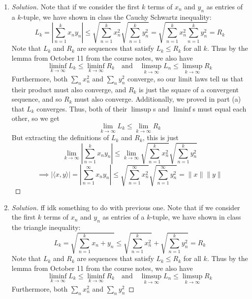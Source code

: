 \documentclass{article}
\begin{document}
\begin{enumerate}
\begin{proof}[Solution]
		Finally, by the comparison test, since $\sum_n (x_n^2 + b_n^2)$,
		we have that $\sum_n (x_ny_n)$ converges as well.
	\end{proof}
	\item \begin{proof}[Solution]\let\qed\relax
		Note that if we consider the first $k$ terms of $x_n$ and $y_n$
		as entries of a $k$-tuple,
		we have shown in class the Cauchy Schwartz inequality:
		\[
			L_k = \left\lvert\sum_{n=1}^k x_ny_n\right\rvert \leq
			\sqrt{\sum_{n=1}^k x^2_n}\sqrt{\sum_{n=1}^k y^2_n}
			= \sqrt{\sum_{n=1}^k x^2_n\sum_{n=1}^k y^2_n} = R_k
		\]
		Note that $L_k$ and $R_k$ are sequences that satisfy $L_k \leq R_k$
		for all $k$.
		Thus by the lemma from October 11 from the course notes,
		we also have
		\[
			\liminf_{k\to\infty} L_k \leq \liminf_{k\to\infty} R_k
			\quad \text{and} \quad
			\limsup_{k\to\infty}L_n \leq \limsup_{k\to\infty}R_k
		\]
		Furthermore, both $\sum_n x_n^2$ and $\sum_n y_n^2$
		converge,
		so our limit laws tell us that their product must also converge,
		and $R_k$ is just the square of a convergent sequence,
		and so $R_k$ must also converge.
		Additionally, we proved in part (a) that $L_k$ converges.
		Thus, both of their $\limsup$s and $\liminf$s
		must equal each other, so we get
		\[
			\lim_{k\to\infty} L_k \leq \lim_{k\to\infty} R_k
		\]
		But extracting the definitions of $L_k$ and $R_k$,
		this is just
		\[
			\lim_{k\to\infty} \left\lvert\sum_{n=1}^k x_ny_n\right\rvert \leq
			\lim_{k\to\infty} \sqrt{\sum_{n=1}^k x^2_n}\sqrt{\sum_{n=1}^k y^2_n}
		\]
		\[
			\implies |\langle x,y \rangle| =
			\left\lvert\sum_{n=1}^\infty x_ny_n\right\rvert \leq
			\sqrt{\sum_{n=1}^\infty x^2_n}\sqrt{\sum_{n=1}^\infty y^2_n}
			= \lVert x \rVert \lVert y \rVert
		\]
	\end{proof}
	\item \begin{proof}[Solution]\let\qed\relax
		ff idk something to do with previous one.
		Note that if we consider the first $k$ terms of $x_n$ and $y_n$
		as entries of a $k$-tuple,
		we have shown in class the triangle inequality:
		\[
			L_k = \sqrt{\sum_{n=1}^k x_n + y_n} \leq
			\sqrt{\sum_{n=1}^k x^2_n} + \sqrt{\sum_{n=1}^k y^2_n} = R_k
		\]
		Note that $L_k$ and $R_k$ are sequences that satisfy $L_k \leq R_k$
		for all $k$.
		Thus by the lemma from October 11 from the course notes,
		we also have
		\[
			\liminf_{k\to\infty} L_k \leq \liminf_{k\to\infty} R_k
			\quad \text{and} \quad
			\limsup_{k\to\infty}L_n \leq \limsup_{k\to\infty}R_k
		\]
		Furthermore, both $\sum_n x_n^2$ and $\sum_n y_n^2$

\end{proof}
\end{enumerate}
\end{document}
